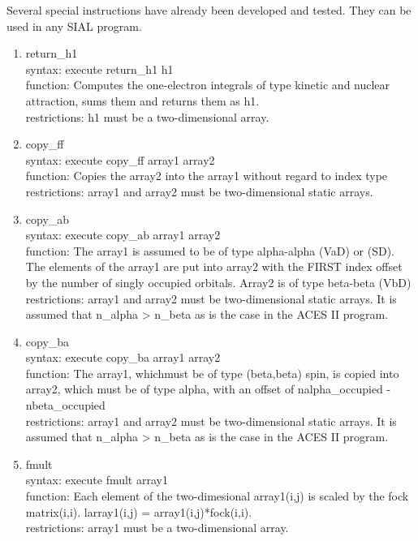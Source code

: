 \documentclass[12pt]{article}
\begin{document}
Several special instructions have already been developed and tested. They can be used in any 
SIAL program.

\begin{enumerate} 

\item return\_h1\\ 
syntax: execute return\_h1 h1\\ 
function: Computes the one-electron integrals of type kinetic and nuclear attraction, sums them 
and returns them as h1.\\ 
restrictions: h1 must be a two-dimensional array.

\item copy\_ff\\ 
syntax: execute copy\_ff array1 array2\\ 
function: Copies the array2 into the array1 without regard to index type\\ 
restrictions: array1 and array2 must be two-dimensional static arrays.

\item copy\_ab\\ 
syntax: execute copy\_ab array1 array2\\ 
function: The array1 is assumed to be of type alpha-alpha (VaD) or (SD). The elements of 
the array1 are put into array2 with the FIRST index offset by the number of singly 
occupied orbitals. Array2 is of type beta-beta (VbD)\\ 
restrictions: array1 and array2 must be two-dimensional static arrays. It is assumed 
that n\_alpha > n\_beta as is the case in the ACES II program.

\item copy\_ba\\ 
syntax: execute copy\_ba array1 array2\\ 
function: The array1, whichmust be of type (beta,beta) spin, is copied into array2, which 
must be of type alpha, with an offset of nalpha\_occupied - nbeta\_occupied\\ 
restrictions: array1 and array2 must be two-dimensional static arrays. It is assumed 
that n\_alpha > n\_beta as is the case in the ACES II program.

\item fmult\\ 
syntax: execute fmult array1\\ 
function: Each element of the two-dimesional array1(i,j) is scaled by the fock matrix(i,i). 
larray1(i,j) = array1(i,j)*fock(i,i).\\ 
restrictions: array1 must be a two-dimensional array.


\end{enumerate}
\end{document}
